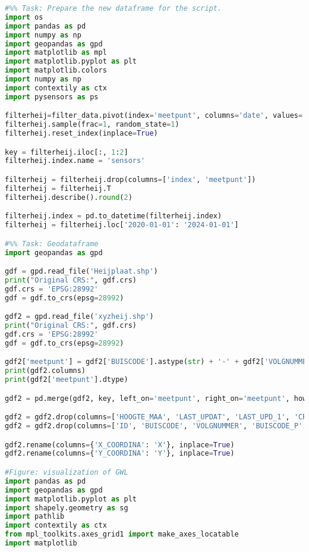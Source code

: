 \begin{lstlisting}[language=Python]
#%% Task: Prepare the new dataframe for the script. 
import os
import pandas as pd 
import numpy as np
import geopandas as gpd
import matplotlib as mpl 
import matplotlib.pyplot as plt 
import matplotlib.colors
import numpy as np 
import contextily as ctx
import pysensors as ps 

filterheij=filter_data.pivot(index='meetpunt', columns='date', values='combination').reset_index()
filterheij.sample(frac=1, random_state=1)
filterheij.reset_index(inplace=True)

key = filterheij.iloc[:, 1:2]
filterheij.index.name = 'sensors'

filterheij = filterheij.drop(columns=['index', 'meetpunt'])
filterheij = filterheij.T
filterheij.describe().round(2)

filterheij.index = pd.to_datetime(filterheij.index)
filterheij = filterheij.loc['2020-01-01': '2024-01-01']

#%% Task: Geodataframe
import geopandas as gpd

gdf = gpd.read_file('Heijplaat.shp')
print("Original CRS:", gdf.crs)
gdf.crs = 'EPSG:28992'
gdf = gdf.to_crs(epsg=28992)

gdf2 = gpd.read_file('xyzheij.shp')
print("Original CRS:", gdf.crs)
gdf.crs = 'EPSG:28992'
gdf = gdf.to_crs(epsg=28992)

gdf2['meetpunt'] = gdf2['BUISCODE'].astype(str) + '-' + gdf2['VOLGNUMMER'].astype(str)
print(gdf2.columns)
print(gdf2['meetpunt'].dtype)

gdf2 = pd.merge(gdf2, key, left_on='meetpunt', right_on='meetpunt', how='left').to_crs(epsg=28992)

gdf2 = gdf2.drop(columns=['HOOGTE_MAA', 'LAST_UPDAT', 'LAST_UPD_1', 'CREATED_BY', 'CREATION_D', 'MAT_CODE'])
gdf2 = gdf2.drop(columns=['ID', 'BUISCODE', 'VOLGNUMMER', 'BUISCODE_P', 'INW_DIAMET', 'HOOGTE_MEE', 'NUL_METING', 'BOVENKANT_', 'LENGTE_BUI', 'HOOGTE_BOV', 'TOEL_AFWIJ', 'BTP_CODE', 'MEETMERK', 'PLAATSBEPA', 'DATUM_STAR', 'DATUM_EIND', 'DATUM_VERV', 'IND_PLAATS'])

gdf2.rename(columns={'X_COORDINA': 'X'}, inplace=True)
gdf2.rename(columns={'Y_COORDINA': 'Y'}, inplace=True)

#Figure: visualization of GWL 
import pandas as pd
import geopandas as gpd
import matplotlib.pyplot as plt
import shapely.geometry as sg
import pathlib
import contextily as ctx
from mpl_toolkits.axes_grid1 import make_axes_locatable
import matplotlib


\end{lstlisting}
